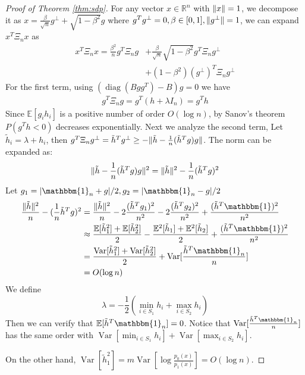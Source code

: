 \documentclass[conference]{IEEEtran}
\DeclarePairedDelimiter\norm{\lVert}{\rVert}
\DeclareMathOperator{\Var}{Var}
\DeclareMathOperator{\diag}{diag}
\begin{document}
\begin{proof}[Proof of Theorem \ref{thm:sdp}]
		For any vector $x \in \mathbb{R}^n$ with $\norm{x}=1$, we decompose it as $x=\frac{\beta}{\sqrt{n}} g^{\perp}
		+ \sqrt{1-\beta^2} g$ where $g^Tg^{\perp}=0, \beta \in [0,1], \norm{g^{\perp}}=1$, we can expand $x^T \Xi_n x$ as
		\begin{align*}
		x^T \Xi_n x = \frac{\beta^2}{n} g^T \Xi_n g  &
		+		\frac{\beta}{\sqrt{n}}\sqrt{1-\beta^2} g^T \Xi_n g^{\perp}
		 \\
		&+
		(1-\beta^2)(g^{\perp})^T \Xi_n g^{\perp} 
		\end{align*}
		For the first term, using $(\diag(Bgg^T) - B)g=0$ we have
		\begin{align*}
		g^T \Xi_n g = g^T(h+\lambda I_n) = g^T h
		\end{align*}
		Since $\mathbb{E}[g_ih_i]$ is a positive number of order $O(\log n)$, by Sanov's theorem
		$P(g^T h < 0)$ decreases exponentially. Next we analyze the second term, Let $\tilde{h}_i
		=\lambda+h_i$, then
		$g^T \Xi_n g^{\perp} = \tilde{h}^T g^{\perp} \geq -\norm{\tilde{h}-\frac{1}{n}(\tilde{h}^Tg)g}$.
		The norm can be expanded as:
		\begin{align*}
		\norm{\tilde{h}-\frac{1}{n}(\tilde{h}^Tg)g}^2
		=\norm{\tilde{h}}^2 - \frac{1}{n}(\tilde{h}^Tg)^2
		\end{align*}
		Let $g_1 = |\mathbbm{1}_n+g|/2, g_2 = |\mathbbm{1}_n-g|/2$
		\begin{align*}
\frac{\norm{\tilde{h}}^2}{n} - (\frac{1}{n}\tilde{h}^Tg)^2
&=\frac{\norm{\tilde{h}}^2}{n} - 2\frac{(\tilde{h}^T g_1)^2}{n^2} - 2\frac{(\tilde{h}^T g_2)^2}{n^2} + \frac{(\tilde{h}^T\mathbbm{1})^2}{n^2} \\
&\approx \frac{\mathbb{E}[\tilde{h}_1^2]+\mathbb{E}[\tilde{h}_2^2]}{2}
-\frac{\mathbb{E}^2[\tilde{h}_1]+\mathbb{E}^2[\tilde{h}_2]}{2}
+\frac{(\tilde{h}^T\mathbbm{1})^2}{n^2}\\
&= \frac{\Var[\tilde{h}_1^2]+\Var[\tilde{h}_2^2]}{2}
+\Var[\frac{\tilde{h}^T\mathbbm{1}_n}{n}]\\
& = O(\log n)
\end{align*}
We define 
\begin{equation}
\lambda = -\frac{1}{2}(\min_{i \in S_1} h_i + \max_{i \in S_2} h_i)
\end{equation}
Then we can verify that $\mathbb{E}[\tilde{h}^T\mathbbm{1}_n]=0$.
Notice that $\Var[\frac{\tilde{h}^T\mathbbm{1}_n}{n}]$ has the same order with
$\Var[\min_{i \in S_1} h_i] + \Var[\max_{i \in S_2} h_i]$.

On the other hand, $\Var[\tilde{h}_1^2] = m \Var[\log \frac{p_0(x)}{p_1(x)}] = O(\log n)$.


\end{proof}
\end{document}
